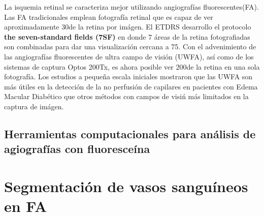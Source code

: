 La isquemia retinal se caracteriza mejor utilizando angiograf\'ias fluorescentes(FA). Las FA tradicionales emplean fotograf\'ia retinal que es capaz de ver aproximadamente 30\degree de la retina por im\'agen. El ETDRS desarrollo el protocolo \textbf{the seven-standard fields (7SF)} en donde 7 \'areas de la retina fotografiadas son combinadas para dar una visualizaci\'on cercana a 75\degree. Con el advenimiento de las angiograf\'ias fluorescentes de ultra campo de visi\'on (UWFA), as\'i como de los sistemas de captura Optos 200Tx, es ahora posible ver 200\degree de la retina en una sola fotograf\'ia. Los estudios a peque\~na escala iniciales mostraron que las UWFA son m\'as \'utiles en la detecci\'on de la no perfusi\'on de capilares en pacientes con Edema Macular Diab\'etico que otros m\'etodos con campos de visi\'n m\'as limitados en la captura de im\'agen.\citep{wessel2012peripheral}

	\subsection{Herramientas computacionales para an\'alisis de agiograf\'ias con fluoresce\'ina}



\section{Segmentaci\'on de vasos sangu\'ineos en FA}

